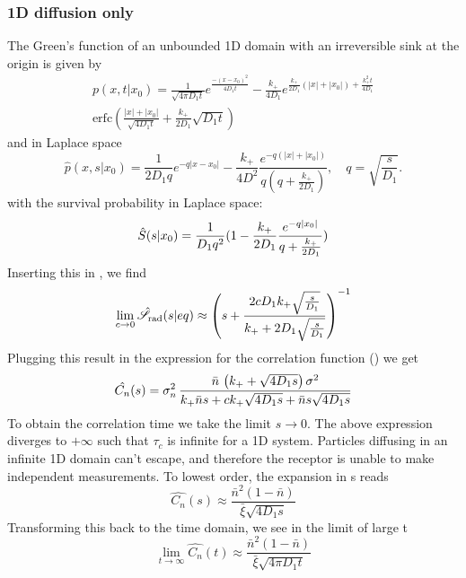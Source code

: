 \subsubsection{1D diffusion only}
The Green's function of an unbounded 1D domain with an irreversible sink at the origin is given by
\begin{multline}
 p(x,t|x_0) = \frac{1}{\sqrt{4 \pi D_1 t}}e^{\frac{-(x-x_0)^2}{4 D_1 t}} - \frac{k_+}{4 D_1}e^{\frac{k_+}{2 D_1}(|x|+|x_0|)+\frac{k_+^2 t}{4 D_1}} \\
\mathrm{erfc}\left( \frac{|x|+|x_0|}{\sqrt{4 D_1 t}}+\frac{k_+}{2 D_1}\sqrt{D_1 t} \right)
\end{multline}
and in Laplace space
\begin{equation}
 \hat{p}(x,s|x_0) = \frac{1}{2 D_1 q}e^{-q|x-x_0|} - \frac{k_+}{4 D^2}\frac{e^{-q(|x|+|x_0|)}}{q(q+\frac{k_+}{2 D_1})}, \quad q=\sqrt{\frac{s}{D_1}}.
\end{equation}
with the survival probability in Laplace space:
\begin{equation}
 \hat{S}(s|x_0) = \frac{1}{D_1 q^2}(1 - \frac{k_+}{2 D_1}\frac{e^{-q|x_0|}}{q+\frac{k_+}{2 D_1}})
 \elabel{LSx0}
\end{equation}
Inserting this in , we find
\begin{equation}
 \lim_{c \rightarrow 0} \hat{\mathscr{S}}_{\rm rad}(s|eq) \approx \left( s + \frac{2 c D_1 k_+ \sqrt{\frac{s}{D_1}}}{k_+ + 2 D_1 \sqrt{\frac{s}{D_1}}} \right)^{-1}
\end{equation}
Plugging this result in the expression for the correlation function () we get
\begin{equation}
  \hat{C_n}(s) = \sigma_n^2 \, \frac{\bar{n} \, \left( k_+ + \sqrt{4 D_1 s} \right) \sigma^2 }{k_+ \bar{n} s + c k_+ \sqrt{4 D_1 s} + \bar{n} s \sqrt{4 D_1 s}}
  \elabel{LapCorr1D}
\end{equation}
To obtain the correlation time we take the limit $s \rightarrow 0$. The above expression diverges to $+\infty$ such that $\tau_c$ is infinite for a 1D system. Particles diffusing in an infinite 1D domain can't escape, and therefore the receptor is unable to make independent measurements.
To lowest order, the expansion in s reads
\begin{equation}
 \hat{C_n}(s) \approx \frac{\bar{n}^2(1-\bar{n})}{\bar{\xi} \sqrt{4 D_1 s}}
\end{equation}
Transforming this back to the time domain, we see in the limit of large t
\begin{equation}
 \lim_{t \rightarrow \infty} \hat{C_n}(t) \approx \frac{\bar{n}^2(1-\bar{n})}{\bar{\xi} \sqrt{4 \pi D_1 t}}
\end{equation}
